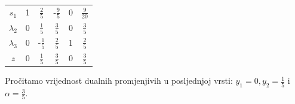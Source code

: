 \documentclass[b5paper, utf8, 11pt, colorlinks]{book}
\theoremstyle{definition}
\begin{document}
\begin{center}
	
	\begin{tabular}{c|cccc|c}\vspace{1mm}
		$s_1$	    &   1      &    $\frac{2}{5}$          &   -$\frac{9}{5}$       &   0          &  $\frac{9}{20}$ \\\vspace{1mm}
		$\lambda_2$  &   0      &    $\frac{1}{5}$         &   $\frac{3}{5}$        &   0          &  $\frac{3}{5}$             \\\vspace{1mm}
		$\lambda_3$  &   0      &    -$\frac{1}{5}$        &   $\frac{2}{5}$        &   1          &  $\frac{2}{5}$            \\ \hline\vspace{1mm}
		$z$          &   0      &    $\frac{1}{5}$         &  $ \frac{3}{5}$        &   0           & $\frac{3}{5}$
	\end{tabular}
	
\end{center} 
  Pročitamo vrijednost dualnih promjenjivih u posljednjoj vrsti: $y_1 =0, y_2=\frac{1}{5}$ i $\alpha=\frac{3}{5}$.
  
\end{document}
